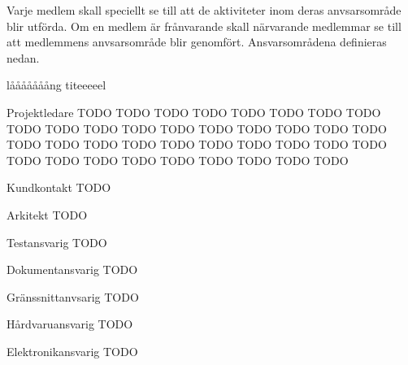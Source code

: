 \documentclass[projektplan/plan.tex]{subfiles}
\begin{document}
Varje medlem skall speciellt se till att de aktiviteter inom deras
anvsarsområde blir utförda. Om en medlem är frånvarande skall närvarande
medlemmar se till att medlemmens anvsarsområde blir genomfört. Ansvarsområdena
definieras nedan.

\begin{labeling}{lååååååång titeeeeel}
    \item[Projektledare] TODO TODO TODO TODO TODO TODO TODO TODO TODO TODO TODO
        TODO TODO TODO TODO TODO TODO TODO TODO TODO TODO TODO TODO TODO TODO
        TODO TODO TODO TODO TODO TODO TODO TODO TODO TODO TODO TODO 
    \item[Kundkontakt] TODO
    \item[Arkitekt] TODO
    \item[Testansvarig] TODO 
    \item[Dokumentansvarig] TODO
    \item[Gränssnittanvsarig] TODO
    \item[Hårdvaruansvarig] TODO
    \item[Elektronikansvarig] TODO
\end{labeling}
\end{document}
